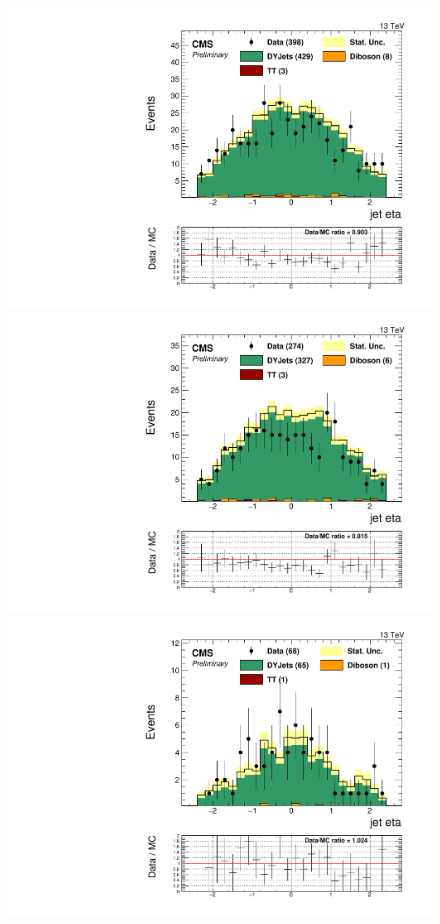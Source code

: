 \begin{figure}[h]
\begin{center}
\includegraphics[scale=0.37]{figures/control/etaZjjMLP.pdf}
\includegraphics[scale=0.37]{figures/control/etaZjjELP.pdf}\\[2cm]
\includegraphics[scale=0.37]{figures/control/etaZjjMHP.pdf}

\end{center}
\end{figure}
